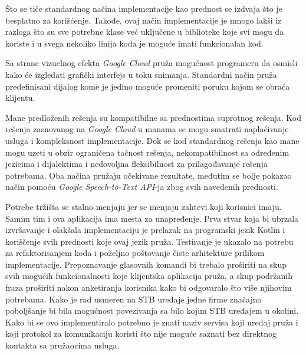 \documentclass[TamaraIvanovicMasterRad.tex]{subfiles}
\begin{document}
Što se tiče standardnog načina implementacije kao prednost se izdvaja što je besplatno za korišćenje. Takođe, ovaj način implementacije je mnogo lakši iz razloga što su sve potrebne klase već uključene u biblioteke koje svi mogu da koriste i u svega nekoliko linija koda je moguće imati funkcionalan kod.

Sa strane vizuelnog efekta \textit{Google Cloud} pruža mogućnost programeru da osmisli kako će izgledati grafički interfejs u toku snimanja. Standardni način pruža predefinisani dijalog kome je jedino moguće promeniti poruku kojom se obraća klijentu. 

Mane predloženih rešenja su kompatibilne sa prednostima suprotnog rešenja. Kod rešenja zasnovanog na \textit{Google Cloud}-u manama se mogu smatrati naplaćivanje usluga i kompleksnost implementacije. Dok se kod standardnog rešenja kao mane mogu uzeti u obzir ograničena tačnost rešenja, nekompatibilnost sa određenim jezicima i dijalektima i nedovoljna fleksibilnost za prilagođavanje rešenja potrebama. Oba načina pružaju očekivane rezultate, međutim se bolje pokazao način pomoću \textit{Google Speech-to-Text API}-ja zbog svih navedenih prednosti. 


Potrebe tržišta se stalno menjaju jer se menjaju zahtevi koji korisnici imaju. Samim tim i ova aplikacija ima mesta za unapređenje. Prva stvar koja bi ubrzala izvršavanje i olakšala implementaciju je prelazak na programski jezik Kotlin i koriščenje svih prednosti koje ovaj jezik pruža. Testiranje je ukazalo na potrebu za refaktorisanjem koda i poželjno poštovanje čiste arhitekture prilikom implementacije. Prepoznavanje glasovnih komandi bi trebalo proširiti na skup svih mogućih funkcionalnosti koje klijentska aplikacija pruža, a skup podržanih fraza proširiti nakon anketiranja korisnika kako bi odgovaralo što više njihovim potrebama. Kako je rad usmeren na STB uređaje jedne firme značajno poboljšanje bi bila mogućnost povezivanja sa bilo kojim STB uređajem u okolini. Kako bi se ovo implementiralo potrebno je znati naziv servisa koji uređaj pruža i koji protokol za komunikaciju koristi što nije moguće saznati bez direktnog kontakta sa pružaocima usluga.
\end{document}
